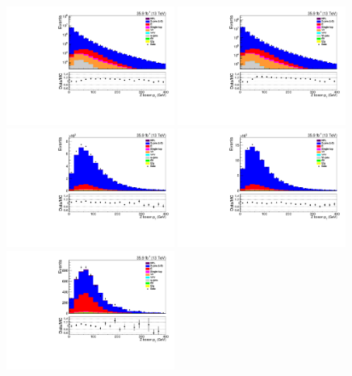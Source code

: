 \begin{figure}[ht]
\centering
\includegraphics[width=0.49\textwidth]{figs/background-estimation/plots/unblinded/prompt_ee_ttbarInc/zPairPt_NPL_ee_lepSel_ee_log.pdf}
\includegraphics[width=0.49\textwidth]{figs/background-estimation/plots/unblinded/prompt_mumu_ttbarInc/zPairPt_NPL_mumu_lepSel_mumu_log.pdf}
\\
\includegraphics[width=0.49\textwidth]{figs/background-estimation/plots/unblinded/prompt_ee_ttbarInc/zPairPt_NPL_ee_jetSel_ee.pdf}
\includegraphics[width=0.49\textwidth]{figs/background-estimation/plots/unblinded/prompt_mumu_ttbarInc/zPairPt_NPL_mumu_jetSel_mumu.pdf}
\\
\includegraphics[width=0.49\textwidth]{figs/background-estimation/plots/unblinded/prompt_ee_ttbarInc/zPairPt_NPL_ee_wMass_ee.pdf}

\end{figure}
